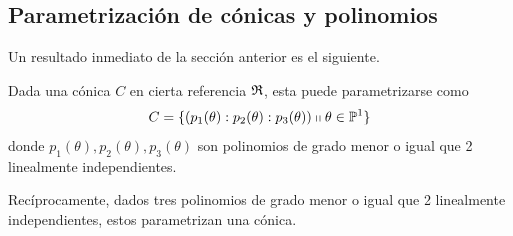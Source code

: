 \subsection{Parametrización de cónicas y polinomios}
Un resultado inmediato de la sección anterior es el siguiente.
\begin{lem}
	\label{C8_lem_conicas_polinomios}
	Dada una cónica $C$ en cierta referencia $\mathfrak{R}$, esta puede parametrizarse como 
	\begin{equation}
	\label{C8_eq_parametrizacion_polinomios}
	C=\{(p_1(\theta):p_2(\theta):p_3(\theta))\shortparallel\theta\in\mathbb{P}^1\}
	\end{equation}
	donde $p_1(\theta),p_2(\theta),p_3(\theta)$ son polinomios de grado menor o igual que 2 linealmente independientes.
	
	Recíprocamente, dados tres polinomios de grado menor o igual que 2 linealmente independientes, estos parametrizan una cónica.
\end{lem}
